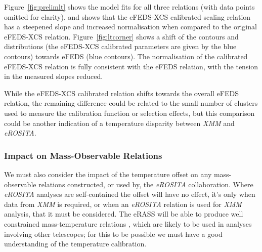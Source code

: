 \documentclass[fleqn,usenatbib]{mnras}
\begin{document}
Figure~\ref{fig:prelimlt} shows the model fits for all three relations (with data points omitted for clarity), and shows that the eFEDS-XCS calibrated scaling relation has a steepened slope and increased normalisation when compared to the original eFEDS-XCS relation.  Figure~\ref{fig:ltcorner} shows a shift of the contours and distributions (the eFEDS-XCS calibrated parameters are given by the blue contours) towards eFEDS (blue contours).  The normalisation of the calibrated eFEDS-XCS relation is fully consistent with the eFEDS relation, with the tension in the measured slopes reduced.  

While the eFEDS-XCS calibrated relation shifts towards the overall eFEDS relation, the remaining difference could be related to the small number of clusters used to measure the calibration function or selection effects, but this comparison could be another indication of a temperature disparity between {\em XMM} and {\em eROSITA}.


\subsubsection{Impact on Mass-Observable Relations}
We must also consider the impact of the temperature offset on any mass-observable relations constructed, or used by, the {\em eROSITA} collaboration. Where {\em eROSITA} analyses are self-contained the offset will have no effect, it's only when data from {\em XMM} is required, or when an {\em eROSITA} relation is used for {\em XMM} analysis, that it must be considered. The eRASS will be able to produce well constrained mass-temperature relations \citep[e.g.,][using eFEDS data]{efedsmor}, which are likely to be used in analyses involving other telescopes; for this to be possible we must have a good understanding of the temperature calibration.
\end{document}
